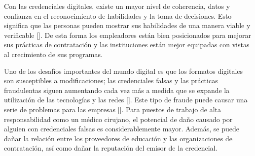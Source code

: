 Con las credenciales digitales, existe un mayor nivel de coherencia, datos y confianza en el reconocimiento de habilidades y la toma de decisiones. Esto significa que las personas pueden mostrar sus habilidades de una manera viable y verificable [\cite{64}]. De esta forma los empleadores están bien posicionados para mejorar sus prácticas de contratación y las instituciones están mejor equipadas con vistas al crecimiento de sus programas.


Uno de los desafíos importantes del mundo digital es que los formatos digitales son susceptibles a modificaciones; las credenciales falsas y las prácticas fraudulentas siguen aumentando cada vez más a medida que se expande la utilización de las tecnologías y las redes [\cite{65,70}]. Este tipo de fraude puede causar una serie de problemas para las empresas [\cite{2}]. Para puestos de trabajo de alta responsabilidad como un médico cirujano, el potencial de daño causado por alguien con credenciales falsas es considerablemente mayor. Además, se puede dañar la relación entre los proveedores de educación y las organizaciones de contratación, así como dañar la reputación del emisor de la credencial.



